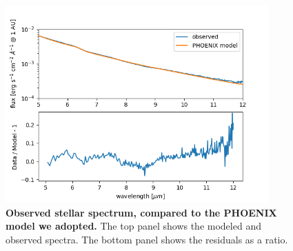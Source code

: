 \documentclass[pdflatex,sn-standardnature]{sn-jnl}%
\begin{document}
\begin{figure}[h]
    \centering
    \includegraphics[width=0.9\textwidth]{stellar_spec_comp}
    \caption{\textbf{Observed stellar spectrum, compared to the PHOENIX model we adopted.}  The top panel shows the modeled and observed spectra. 
 The bottom panel shows the residuals as a ratio.}
    \label{fig:stellar_spec_comp} 
\end{figure}

\end{document}
